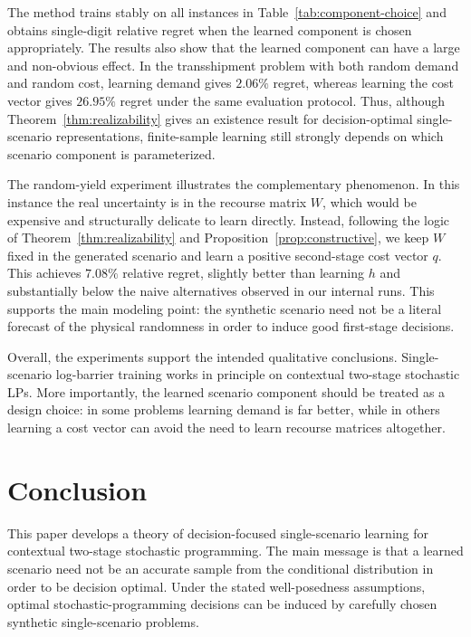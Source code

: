 \documentclass{article}
\newcommand{\1}{\mathbf{1}}
\theoremstyle{plain}
\theoremstyle{definition}
\theoremstyle{remark}
\begin{document}
The method trains stably on all instances in Table~\ref{tab:component-choice} and obtains single-digit relative regret when the learned component is chosen appropriately. The results also show that the learned component can have a large and non-obvious effect. In the transshipment problem with both random demand and random cost, learning demand gives $2.06\%$ regret, whereas learning the cost vector gives $26.95\%$ regret under the same evaluation protocol. Thus, although Theorem~\ref{thm:realizability} gives an existence result for decision-optimal single-scenario representations, finite-sample learning still strongly depends on which scenario component is parameterized.

The random-yield experiment illustrates the complementary phenomenon. In this instance the real uncertainty is in the recourse matrix $W$, which would be expensive and structurally delicate to learn directly. Instead, following the logic of Theorem~\ref{thm:realizability} and Proposition~\ref{prop:constructive}, we keep $W$ fixed in the generated scenario and learn a positive second-stage cost vector $q$. This achieves $7.08\%$ relative regret, slightly better than learning $h$ and substantially below the naive alternatives observed in our internal runs. This supports the main modeling point: the synthetic scenario need not be a literal forecast of the physical randomness in order to induce good first-stage decisions.

Overall, the experiments support the intended qualitative conclusions. Single-scenario log-barrier training works in principle on contextual two-stage stochastic LPs. More importantly, the learned scenario component should be treated as a design choice: in some problems learning demand is far better, while in others learning a cost vector can avoid the need to learn recourse matrices altogether.

\section{Conclusion}
\label{sec:conclusion}

This paper develops a theory of decision-focused single-scenario learning for contextual two-stage stochastic programming. The main message is that a learned scenario need not be an accurate sample from the conditional distribution in order to be decision optimal. Under the stated well-posedness assumptions, optimal stochastic-programming decisions can be induced by carefully chosen synthetic single-scenario problems.
\end{document}
